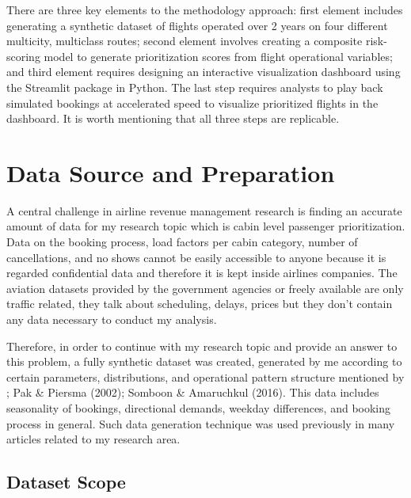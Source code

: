There are three key elements to the methodology approach: first element includes generating a synthetic dataset of flights operated over 2 years on four different multicity, multiclass routes; second element involves creating a composite risk-scoring model to generate prioritization scores from flight operational variables; and third element requires designing an interactive visualization dashboard using the Streamlit package in Python. The last step requires analysts to play back simulated bookings at accelerated speed to visualize prioritized flights in the dashboard. It is worth mentioning that all three steps are replicable.

\section{Data Source and Preparation}

A central challenge in airline revenue management research is finding an accurate amount of data for my research topic which is cabin level passenger prioritization. Data on the booking process, load factors per cabin category, number of cancellations, and no shows cannot be easily accessible to anyone because it is regarded confidential data and therefore it is kept inside airlines companies. The aviation datasets provided by the government agencies or freely available are only traffic related, they talk about scheduling, delays, prices but they don't contain any data necessary to conduct my analysis.

Therefore, in order to continue with my research topic and provide an answer to this problem, a fully synthetic dataset was created, generated by me according to certain parameters, distributions, and operational pattern structure mentioned by \citet{Belobaba1987,Belobaba1989}; Pak \& Piersma (2002); Somboon \& Amaruchkul (2016). This data includes seasonality of bookings, directional demands, weekday differences, and booking process in general. Such data generation technique was used previously in many articles related to my research area.

\subsection{Dataset Scope}

